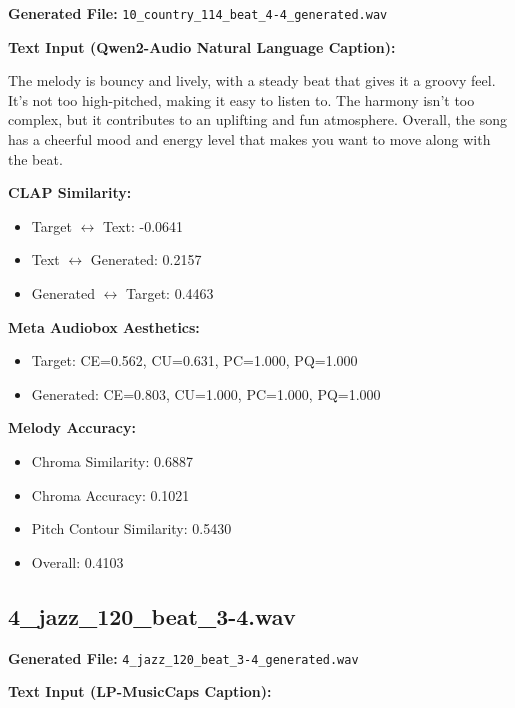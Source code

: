 \documentclass{article}
\begin{document}
\textbf{Generated File:} \texttt{10\_country\_114\_beat\_4-4\_generated.wav}

\textbf{Text Input (Qwen2-Audio Natural Language Caption):}

\small
The melody is bouncy and lively, with a steady beat that gives it a groovy feel. It's not too high-pitched, making it easy to listen to. The harmony isn't too complex, but it contributes to an uplifting and fun atmosphere. Overall, the song has a cheerful mood and energy level that makes you want to move along with the beat.
\normalsize

\textbf{CLAP Similarity:}
\begin{itemize}
    \item Target $\leftrightarrow$ Text: -0.0641
    \item Text $\leftrightarrow$ Generated: 0.2157
    \item Generated $\leftrightarrow$ Target: 0.4463
\end{itemize}

\textbf{Meta Audiobox Aesthetics:}
\begin{itemize}
    \item Target: CE=0.562, CU=0.631, PC=1.000, PQ=1.000
    \item Generated: CE=0.803, CU=1.000, PC=1.000, PQ=1.000
\end{itemize}

\textbf{Melody Accuracy:}
\begin{itemize}
    \item Chroma Similarity: 0.6887
    \item Chroma Accuracy: 0.1021
    \item Pitch Contour Similarity: 0.5430
    \item Overall: 0.4103
\end{itemize}

\subsection{4\_jazz\_120\_beat\_3-4.wav}

\textbf{Generated File:} \texttt{4\_jazz\_120\_beat\_3-4\_generated.wav}

\textbf{Text Input (LP-MusicCaps Caption):}
\end{document}
